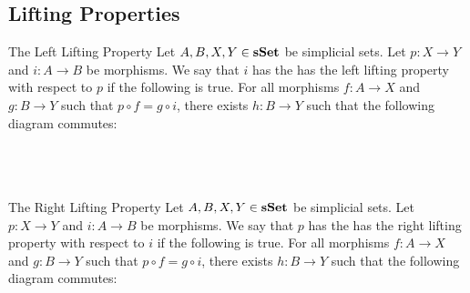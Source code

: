 \documentclass[a4paper]{article}
\begin{document}
\subsection{Lifting Properties}
\begin{defn}{The Left Lifting Property}{} Let $A,B,X,Y\in\bold{sSet}$ be simplicial sets. Let $p:X\to Y$ and $i:A\to B$ be morphisms. We say that $i$ has the has the left lifting property with respect to $p$ if the following is true. For all morphisms $f:A\to X$ and $g:B\to Y$ such that $p\circ f=g\circ i$, there exists $h:B\to Y$ such that the following diagram commutes: \\~\\
\\~\\
\end{defn}

\begin{defn}{The Right Lifting Property}{} Let $A,B,X,Y\in\bold{sSet}$ be simplicial sets. Let $p:X\to Y$ and $i:A\to B$ be morphisms. We say that $p$ has the has the right lifting property with respect to $i$ if the following is true. For all morphisms $f:A\to X$ and $g:B\to Y$ such that $p\circ f=g\circ i$, there exists $h:B\to Y$ such that the following diagram commutes: \\~\\
\\~\\
\end{defn}
\end{document}
